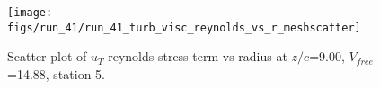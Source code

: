 \begin{figure}[H]
\centering
\texttt{[image: figs/run\_41/run\_41\_turb\_visc\_reynolds\_vs\_r\_meshscatter]}
\caption{Scatter plot of $
u_T$ reynolds stress term vs radius at $z/c$=9.00, $V_{free}$=14.88, station 5.}
\label{fig:run_41_turb_visc_reynolds_vs_r_meshscatter}
\end{figure}


